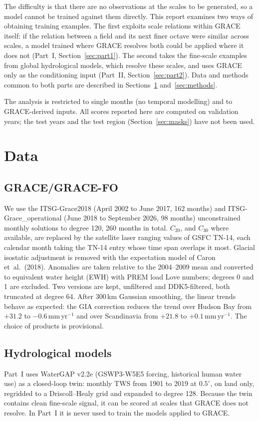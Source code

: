 \documentclass[11pt,a4paper]{article}
\begin{document}
The difficulty is that there are no observations at the scales to be generated, so a model
cannot be trained against them directly. This report examines two ways of obtaining training
examples. The first exploits scale relations within GRACE itself: if the relation between a
field and its next finer octave were similar across scales, a model trained where GRACE
resolves both could be applied where it does not (Part~I, Section~\ref{sec:part1}). The second
takes the fine-scale examples from global hydrological models, which resolve these scales, and
uses GRACE only as the conditioning input (Part~II, Section~\ref{sec:part2}). Data and methods
common to both parts are described in Sections~\ref{sec:data} and~\ref{sec:methods}.

The analysis is restricted to single months (no temporal modelling) and to GRACE-derived inputs.
All scores reported here are computed on validation years; the test years and the test region
(Section~\ref{sec:masks}) have not been used.

\section{Data}\label{sec:data}

\subsection{GRACE/GRACE-FO}
We use the ITSG-Grace2018 (April 2002 to June 2017, 162 months) and ITSG-Grace\_operational
(June 2018 to September 2026, 98 months) unconstrained monthly solutions to degree 120, 260
months in total. $C_{20}$, and $C_{30}$ where available, are replaced by the satellite laser
ranging values of GSFC TN-14, each calendar month taking the TN-14 entry whose time span
overlaps it most. Glacial isostatic adjustment is removed with the expectation model of Caron
et~al.\ (2018). Anomalies are taken relative to the 2004--2009 mean and converted to equivalent
water height (EWH) with PREM load Love numbers; degrees 0 and 1 are excluded. Two versions are
kept, unfiltered and DDK5-filtered, both truncated at degree 64. After 300\,km Gaussian
smoothing, the linear trends behave as expected: the GIA correction reduces the trend over
Hudson Bay from $+31.2$ to $-0.6$\,mm\,yr$^{-1}$ and over Scandinavia from $+21.8$ to
$+0.1$\,mm\,yr$^{-1}$. The choice of products is provisional.

\subsection{Hydrological models}
Part~I uses WaterGAP v2.2e (GSWP3-W5E5 forcing, historical human water use) as a closed-loop
twin: monthly TWS from 1901 to 2019 at $0.5^\circ$, on land only, regridded to a
Driscoll--Healy grid and expanded to degree 128. Because the twin contains clean fine-scale
signal, it can be scored at scales that GRACE does not resolve. In Part~I it is never used to
train the models applied to GRACE.
\end{document}
